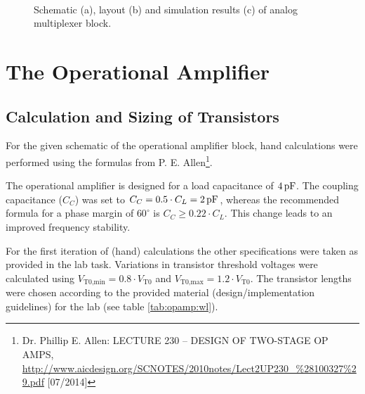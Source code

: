 \documentclass[parskip,oneside,colorbacktitle,10pt,accentcolor=tud1b,table]{tudreport}
\begin{document}
{\begin{figure}[H]
\begin{center}
{        }\\
        \caption{Schematic (a), layout (b) and simulation results (c) of analog multiplexer block.} 
        \label{fig:analog_mux}
    \end{center}
\end{figure}


\chapter{The Operational Amplifier}

\section{Calculation and Sizing of Transistors}

For the given schematic of the operational amplifier block, hand calculations were performed using the formulas from P. E. Allen\footnote{Dr. Phillip E. Allen: \glqq LECTURE 230 – DESIGN OF TWO-STAGE OP AMPS\grqq, \url{http://www.aicdesign.org/SCNOTES/2010notes/Lect2UP230\_\%28100327\%29.pdf} [07/2014]}.

The operational amplifier is designed for a load capacitance of $\unit[4]{pF}$. The coupling capacitance ($C_C$) was set to $C_C = 0.5 \cdot C_L = \unit[2]{pF}$, whereas the recommended formula for a phase margin of $60^\circ$ is $C_C \geq 0.22 \cdot C_L$. This change leads to an improved frequency stability.

For the first iteration of (hand) calculations the other specifications were taken as provided in the lab task. Variations in transistor threshold voltages were calculated using $V_\text{T0,min} = 0.8 \cdot V_\text{T0}$ and $V_\text{T0,max} = 1.2 \cdot V_\text{T0}$. The transistor lengths were chosen according to the provided material (design/implementation guidelines) for the lab (see table \ref{tab:opamp:wl}). 

}
\end{document}
